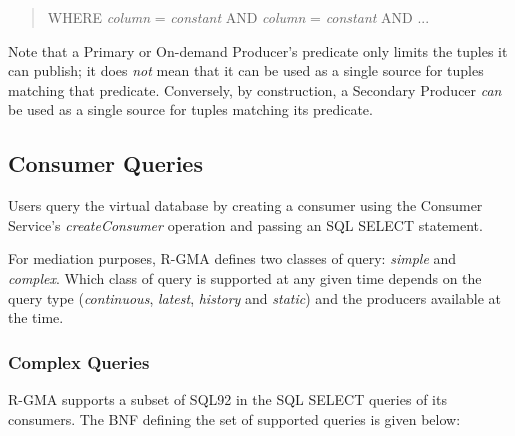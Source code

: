 \begin{quote}
WHERE \textit{column} = \textit{constant} AND
                   \textit{column} = \textit{constant} AND ...
\end{quote}

Note that a Primary or On-demand Producer's predicate only limits the
tuples it can publish; it does \textit{not} mean that it can be used
as a single source for tuples matching that predicate. Conversely, by
construction, a Secondary Producer \textit{can} be used as a single
source for tuples matching its predicate.

\subsection{Consumer Queries}\label{sec:SQLSelect}

Users query the virtual database by creating a consumer using the
Consumer Service's \textit{createConsumer} operation and passing an
SQL SELECT statement.

For mediation purposes, R-GMA defines two classes of query:
\textit{simple} and \textit{complex}. Which class of query
is supported at any given time depends on the query type
(\textit{continuous}, \textit{latest}, \textit{history} and
\textit{static}) and the producers available at the time.

\subsubsection{Complex Queries}\label{sec:SQLComplexQueries}

R-GMA supports a subset of SQL92 in the SQL SELECT queries of its consumers.
The BNF defining the set of supported queries is given below:

